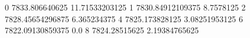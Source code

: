 0 7833.806640625 11.71533203125
1 7830.84912109375 8.7578125
2 7828.45654296875 6.365234375
4 7825.173828125 3.08251953125
6 7822.09130859375 0.0
8 7824.28515625 2.19384765625
